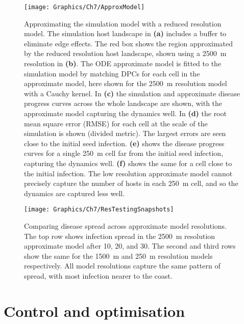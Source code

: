 \begin{figure}[H]
    \begin{center}
        \texttt{[image: Graphics/Ch7/ApproxModel]}
        \caption[Approximating the simulation model with a reduced resolution model]{Approximating the simulation model with a reduced resolution model. The simulation host landscape in \textbf{(a)} includes a buffer to eliminate edge effects. The red box shows the region approximated by the reduced resolution host landscape, shown using a \SI{2500}{\meter} resolution in \textbf{(b)}. The ODE approximate model is fitted to the simulation model by matching DPCs for each cell in the approximate model, here shown for the \SI{2500}{\meter} resolution model with a Cauchy kernel. In \textbf{(c)} the simulation and approximate disease progress curves across the whole landscape are shown, with the approximate model capturing the dynamics well. In \textbf{(d)} the root mean square error (RMSE) for each cell at the scale of the simulation is shown (divided metric). The largest errors are seen close to the initial seed infection. \textbf{(e)} shows the disease progress curves for a single \SI{250}{\meter} cell far from the initial seed infection, capturing the dynamics well. \textbf{(f)} shows the same for a cell close to the initial infection. The low resolution approximate model cannot precisely capture the number of hosts in each \SI{250}{\meter} cell, and so the dynamics are captured less well.\label{fig:ch7:approx_model}}
    \end{center}
\end{figure}

\begin{figure}
    \begin{center}
        \texttt{[image: Graphics/Ch7/ResTestingSnapshots]}
        \caption[Comparing disease spread across approximate model resolutions]{Comparing disease spread across approximate model resolutions. The top row shows infection spread in the \SI{2500}{\meter} resolution approximate model after 10, 20, and \SI{30}{\years}. The second and third rows show the same for the \SI{1500}{\meter} and \SI{250}{\meter} resolution models respectively. All model resolutions capture the same pattern of spread, with most infection nearer to the coast.\label{fig:ch7:resolution_snapshots}}
    \end{center}
\end{figure}

\section{Control and optimisation\label{sec:ch7:optim_methods}}

